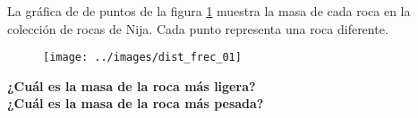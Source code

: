 La gráfica de de puntos de la figura \ref{fig:dist_frec_01} muestra la masa de cada roca en la colección de rocas de Nija.
Cada punto representa una roca diferente.

\begin{figure}[H]
    \begin{center}
        \texttt{[image: ../images/dist\_frec\_01]}
    \end{center}
    \caption{}
    \label{fig:dist_frec_01}
\end{figure}
\textbf{¿Cuál es la masa de la roca más ligera?}\\
\textbf{¿Cuál es la masa de la roca más pesada?}